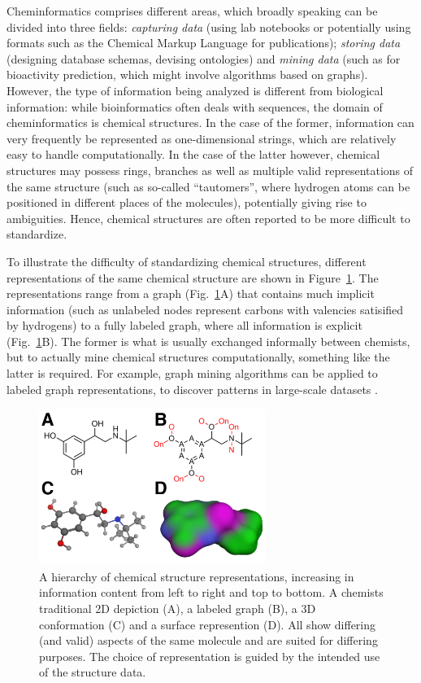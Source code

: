 \documentclass{sig-alternate}
\begin{document}
Cheminformatics comprises different areas, which broadly speaking can
be divided into three fields: \emph{capturing data} (using lab
notebooks or potentially using formats such as the Chemical Markup
Language for publications); \emph{storing data} (designing database
schemas, devising ontologies) and \emph{mining data} (such as for
bioactivity prediction, which might involve algorithms based on
graphs).  However, the type of information being analyzed is different
from biological information: while bioinformatics often deals with
sequences, the domain of cheminformatics is chemical structures. In
the case of the former, information can very frequently be represented
as one-dimensional strings, which are relatively easy to handle
computationally. In the case of the latter however, chemical
structures may possess rings, branches as well as multiple valid
representations of the same structure (such as so-called
``tautomers'', where hydrogen atoms can be positioned in different
places of the molecules), potentially giving rise to
ambiguities. Hence, chemical structures are often reported to be more
difficult to standardize.

To illustrate the difficulty of standardizing chemical structures,
different representations of the same chemical structure are shown in
Figure~\ref{figure:chemical-structures}. The representations range
from a graph (Fig.~\ref{figure:chemical-structures}A) that contains
much implicit information (such as unlabeled nodes represent carbons
with valencies satisified by hydrogens) to a fully labeled graph,
where all information is explicit
(Fig.~\ref{figure:chemical-structures}B). The former is what is
usually exchanged informally between chemists, but to actually mine
chemical structures computationally, something like the latter is
required.  For example, graph mining algorithms can be applied to
labeled graph representations, to discover patterns in large-scale
datasets \cite{wegner2006,horst2009}.

\begin{figure}
\centering
\includegraphics[height=2in]{chemstructs.png}
\caption{A hierarchy of chemical structure representations, increasing
  in information content from left to right and top to bottom. A
  chemists traditional 2D depiction (A), a labeled graph (B), a 3D
  conformation (C) and a surface represention (D). All show differing
  (and valid) aspects of the same molecule and are suited for
  differing purposes. The choice of representation is guided by the
  intended use of the structure data.}
\label{figure:chemical-structures}
\end{figure}
\end{document}
